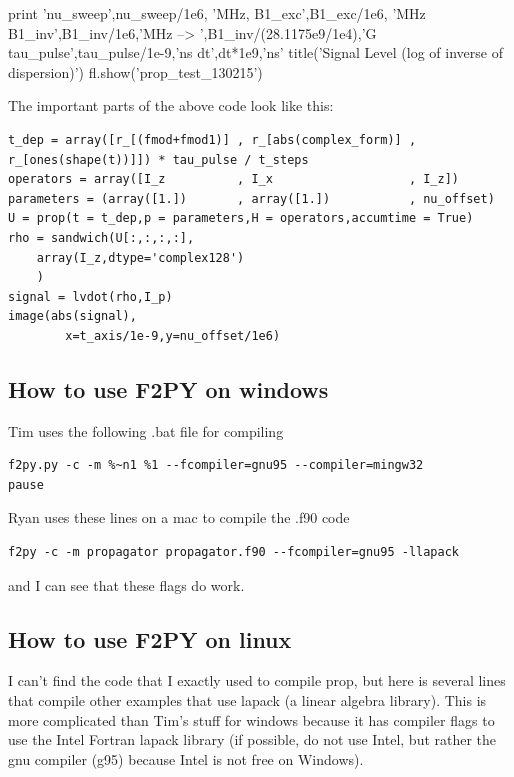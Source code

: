 \begin{python}
print 'nu_sweep',nu_sweep/1e6, 'MHz, B1_exc',B1_exc/1e6, 'MHz B1_inv',B1_inv/1e6,'MHz --> ',B1_inv/(28.1175e9/1e4),'G tau_pulse',tau_pulse/1e-9,'ns dt',dt*1e9,'ns'
title('Signal Level (log of inverse of dispersion)')
fl.show('prop_test_130215')
\end{python}

The important parts of the above code look like this:

\begin{lstlisting}
t_dep = array([r_[(fmod+fmod1)] , r_[abs(complex_form)] , r_[ones(shape(t))]]) * tau_pulse / t_steps
operators = array([I_z          , I_x                   , I_z])
parameters = (array([1.])       , array([1.])           , nu_offset)
U = prop(t = t_dep,p = parameters,H = operators,accumtime = True)
rho = sandwich(U[:,:,:,:],
	array(I_z,dtype='complex128')
	)
signal = lvdot(rho,I_p)
image(abs(signal),
		x=t_axis/1e-9,y=nu_offset/1e6)
\end{lstlisting}
\subsection{How to use F2PY on windows}
Tim uses the following .bat file for compiling

\begin{verbatim}
f2py.py -c -m %~n1 %1 --fcompiler=gnu95 --compiler=mingw32
pause
\end{verbatim}

Ryan uses these lines on a mac to compile the .f90 code
\begin{verbatim}
f2py -c -m propagator propagator.f90 --fcompiler=gnu95 -llapack
\end{verbatim}

and I can see that these flags do work.
\subsection{How to use F2PY on linux}
I can't find the code that I exactly used to compile prop,
but here is several lines that compile other examples that use lapack (a linear algebra library).
This is more complicated than Tim's stuff for windows because it has compiler flags to use the Intel Fortran lapack library (if possible, do not use Intel, but rather the gnu compiler (g95) because Intel is not free on Windows).

